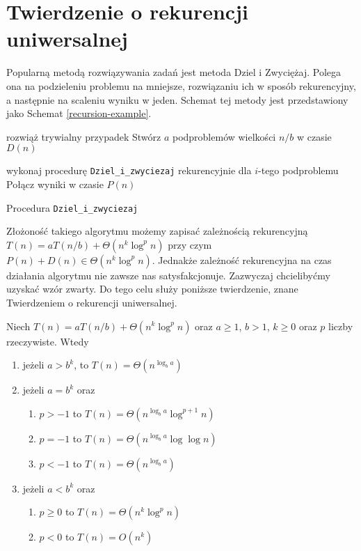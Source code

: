 \section{Twierdzenie o rekurencji uniwersalnej}

Popularną metodą rozwiązywania zadań jest metoda Dziel i Zwyciężaj.
Polega ona na podzieleniu problemu na mniejsze, rozwiązaniu ich w sposób rekurencyjny, a następnie na scaleniu wyniku w jeden.
Schemat tej metody jest przedstawiony jako Schemat \ref{recursion-example}.
\begin{algorithm}[h]
  \DontPrintSemicolon
    
  {
    rozwiąż trywialny przypadek
  }
  Stwórz $a$ podproblemów wielkości $n/b$ w czasie $D(n)$
  
  
  {
   	wykonaj procedurę \texttt{Dziel\_i\_zwyciezaj} rekurencyjnie dla $i$-tego podproblemu
  }
  Połącz wyniki w czasie $P(n)$
  \caption{Procedura \texttt{Dziel\_i\_zwyciezaj}}
  \label{recursion-example}
\end{algorithm}

Złożoność takiego algorytmu możemy zapisać zależnością rekurencyjną $T(n) = aT(n/b) + \Theta(n^k \log^{p} n)$ przy czym $P(n) + D(n) \in \Theta(n^k \log^{p} n)$.
Jednakże zależność rekurencyjna na czas działania algorytmu nie zawsze nas satysfakcjonuje.
Zazwyczaj chcielibyćmy uzyskać wzór zwarty.
Do tego celu służy poniższe twierdzenie, znane Twierdzeniem o rekurencji uniwersalnej.

\begin{theorem}
 Niech $T(n) = aT(n/b) + \Theta(n^k \log^{p} n)$ oraz $a \geq 1$, $b > 1$, $k \geq 0$ oraz $p$ liczby rzeczywiste.
 Wtedy
\begin{enumerate}
\item jeżeli $a > b^k$, to $T(n) = \Theta(n^{\log_b a})$ \label{mt-1}
\item jeżeli $a = b^k$ oraz 
\begin{enumerate}
 \item $p > -1$ to $T(n) = \Theta(n^{\log_b a} \log^{p + 1} n)$ \label{mt-2a}
 \item $p = -1$ to $T(n) = \Theta(n^{\log_b a} \log \log n)$ \label{mt-2b}
 \item $p < -1$ to $T(n) = \Theta(n^{\log_b a})$ \label{mt-2c}
\end{enumerate}
\item jeżeli $a < b^k$ oraz
\begin{enumerate}
 \item $p \geq 0$ to $T(n) = \Theta(n^k \log^{p} n)$ \label{mt-3a}
 \item $p < 0$ to $T(n) = O(n^k)$ \label{mt-3b}
\end{enumerate}
\end{enumerate}
 \label{Master}
\end{theorem}

